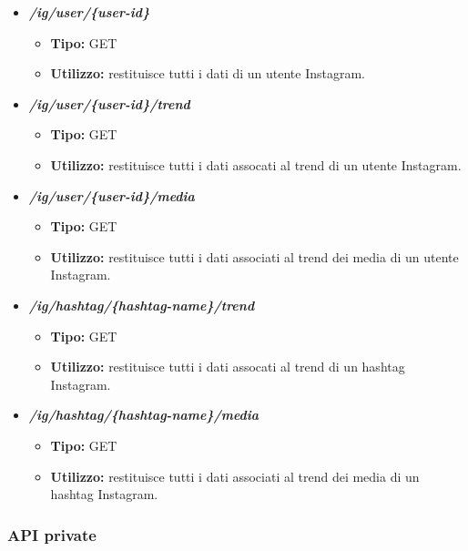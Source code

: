 \begin{itemize}
  \item \textit{\textbf{/ig/user/\{user-id\}}}
  \begin{itemize}
    \item \textbf{Tipo:} GET
    \item \textbf{Utilizzo:} restituisce tutti i dati di un utente Instagram.
  \end{itemize}
  \item \textit{\textbf{/ig/user/\{user-id\}/trend}}
  \begin{itemize}
    \item \textbf{Tipo:} GET
    \item \textbf{Utilizzo:} restituisce tutti i dati assocati al trend di un utente Instagram.
  \end{itemize}
  \item \textit{\textbf{/ig/user/\{user-id\}/media}}
  \begin{itemize}
    \item \textbf{Tipo:} GET
    \item \textbf{Utilizzo:} restituisce tutti i dati associati al trend dei media di un utente Instagram.
  \end{itemize}
  \item \textit{\textbf{/ig/hashtag/\{hashtag-name\}/trend}}
  \begin{itemize}
    \item \textbf{Tipo:} GET
    \item \textbf{Utilizzo:} restituisce tutti i dati assocati al trend di un hashtag Instagram.
  \end{itemize}
  \item \textit{\textbf{/ig/hashtag/\{hashtag-name\}/media}}
  \begin{itemize}
    \item \textbf{Tipo:} GET
    \item \textbf{Utilizzo:} restituisce tutti i dati associati al trend dei media di un hashtag Instagram.
  \end{itemize}

\end{itemize}

\subsubsection{API private}
\label{ssub:api_private}

